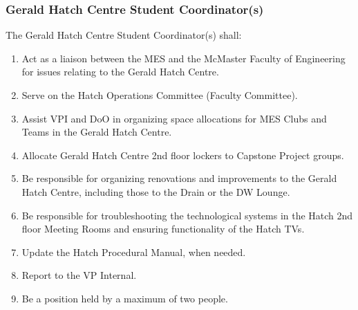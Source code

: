 
\subsubsection{Gerald Hatch Centre Student Coordinator(s)}
\label{gerald-hatch-centre-student-coordinators}
The Gerald Hatch Centre Student Coordinator(s) shall:

\begin{enumerate}
 \item
  Act as a liaison between the MES and the McMaster Faculty of Engineering for issues relating to the Gerald Hatch Centre.
 \item
  Serve on the Hatch Operations Committee (Faculty Committee).
 \item
  Assist VPI and DoO in organizing space allocations for MES Clubs and Teams in the Gerald Hatch Centre. 
 \item    
  Allocate Gerald Hatch Centre 2nd floor lockers to Capstone Project groups.
 \item
  Be responsible for organizing renovations and improvements to the Gerald Hatch Centre, including those to the Drain or the DW Lounge.
 \item
  Be responsible for troubleshooting the technological systems in the Hatch 2nd floor Meeting Rooms and ensuring functionality of the Hatch TVs.
 \item
  Update the Hatch Procedural Manual, when needed.
 \item
  Report to the VP Internal.
 \item
  Be a position held by a maximum of two people.

\end{enumerate}